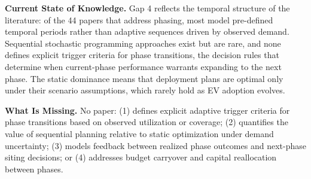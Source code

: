 \documentclass[letterpaper, 12pt, oneside, doublespacing]{Thesis}
\begin{document}
\noindent \textbf{Current State of Knowledge.} Gap 4 reflects the temporal structure of the literature: of the 44 papers that address phasing, most model pre-defined temporal periods rather than adaptive sequences driven by observed demand. Sequential stochastic programming approaches exist but are rare, and none defines explicit trigger criteria for phase transitions, the decision rules that determine when current-phase performance warrants expanding to the next phase. The static dominance means that deployment plans are optimal only under their scenario assumptions, which rarely hold as EV adoption evolves.



\noindent \textbf{What Is Missing.} No paper: (1) defines explicit adaptive trigger criteria for phase transitions based on observed utilization or coverage; (2) quantifies the value of sequential planning relative to static optimization under demand uncertainty; (3) models feedback between realized phase outcomes and next-phase siting decisions; or (4) addresses budget carryover and capital reallocation between phases.
\end{document}
